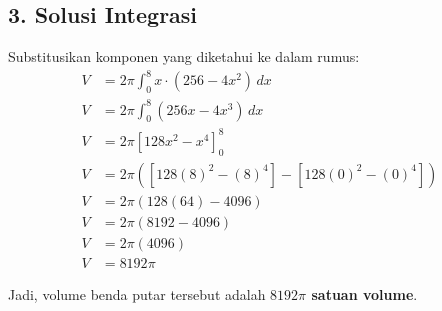 \documentclass[12pt,a4paper]{article}
\begin{document}
\subsection*{3. Solusi Integrasi}
Substitusikan komponen yang diketahui ke dalam rumus:
\begin{align*}
  V &= 2\pi \int_{0}^{8} x \cdot (256 - 4x^2) \, dx \\
  V &= 2\pi \int_{0}^{8} (256x - 4x^3) \, dx \\
  V &= 2\pi \left[ 128x^2 - x^4 \right]_{0}^{8} \\
  V &= 2\pi \left( \left[ 128(8)^2 - (8)^4 \right] - \left[ 128(0)^2 - (0)^4 \right] \right) \\
  V &= 2\pi \left( 128(64) - 4096 \right) \\
  V &= 2\pi (8192 - 4096) \\
  V &= 2\pi (4096) \\
  V &= 8192\pi
\end{align*}

Jadi, volume benda putar tersebut adalah \textbf{$8192\pi$ satuan volume}.
\end{document}
